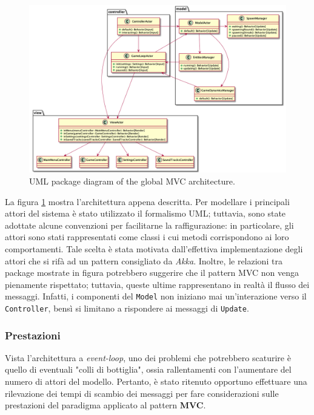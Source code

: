 \begin{figure}[H]
    \centering
    \includegraphics[width=\linewidth]{img/global-architecture}
    \caption{UML package diagram of the global MVC architecture.}
    \label{fig:global-architecture}
\end{figure}

La figura \ref{fig:global-architecture} mostra l'architettura appena descritta. Per modellare i principali attori del
sistema è stato utilizzato il formalismo UML; tuttavia, sono state adottate alcune convenzioni per facilitarne la
raffigurazione: in particolare, gli attori sono stati rappresentati come classi i cui metodi corrispondono ai loro
comportamenti. Tale scelta è stata motivata dall'effettiva implementazione degli attori che si rifà ad un pattern
consigliato da \textit{Akka}.
Inoltre, le relazioni tra package mostrate in figura potrebbero suggerire che il pattern MVC non venga pienamente
rispettato; tuttavia, queste ultime rappresentano in realtà il flusso dei messaggi. Infatti, i componenti del
\texttt{Model} non iniziano mai un'interazione verso il \texttt{Controller}, bensì si limitano a rispondere ai messaggi
di \texttt{Update}.

\subsubsection{Prestazioni}
Vista l'architettura a \textit{event-loop}, uno dei problemi che potrebbero scaturire è quello di eventuali "colli di
bottiglia", ossia rallentamenti con l'aumentare del numero di attori del modello. Pertanto, è stato ritenuto opportuno
effettuare una rilevazione dei tempi di scambio dei messaggi per fare considerazioni sulle prestazioni del paradigma
applicato al pattern \textbf{MVC}.

